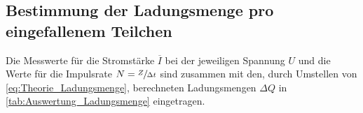 \subsection{Bestimmung der Ladungsmenge pro eingefallenem Teilchen}	
	
	Die Messwerte für die Stromstärke $\overline{I}$ bei der jeweiligen Spannung
	$U$ und die Werte für die Impulsrate $N = \sfrac{Z}{\Delta t}$ sind zusammen mit
	den, durch Umstellen von \cref{eq:Theorie_Ladungsmenge}, berechneten Ladungsmengen
	$\Delta Q$ in \cref{tab:Auswertung_Ladungsmenge} eingetragen.
	
	
	

